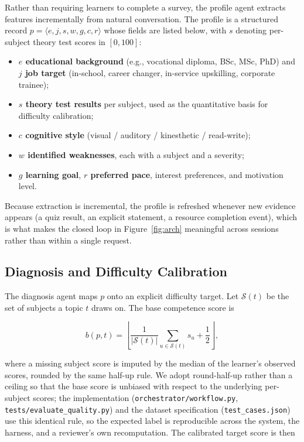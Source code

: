 Rather than requiring learners to complete a survey, the profile agent
extracts features incrementally from natural conversation. The profile is a
structured record $p = \langle e, j, s, w, g, c, r \rangle$ whose fields are
listed below, with $s$ denoting per-subject theory test scores in $[0,100]$:

\begin{itemize}
\item \textbf{$e$ educational background} (e.g., vocational diploma, BSc, MSc,
PhD) and \textbf{$j$ job target} (in-school, career changer, in-service
upskilling, corporate trainee);
\item \textbf{$s$ theory test results} per subject, used as the quantitative
basis for difficulty calibration;
\item \textbf{$c$ cognitive style} (visual / auditory / kinesthetic /
read-write);
\item \textbf{$w$ identified weaknesses}, each with a subject and a severity;
\item \textbf{$g$ learning goal}, \textbf{$r$ preferred pace}, interest
preferences, and motivation level.
\end{itemize}

Because extraction is incremental, the profile is refreshed whenever new
evidence appears (a quiz result, an explicit statement, a resource
completion event), which is what makes the closed loop in
Figure~\ref{fig:arch} meaningful across sessions rather than within a single
request.

\subsection{Diagnosis and Difficulty Calibration}
\label{ssec:diagnosis}

The diagnosis agent maps $p$ onto an explicit difficulty target. Let
$\mathcal{S}(t)$ be the set of subjects a topic $t$ draws on. The base
competence score is

\begin{equation}
b(p,t) = \left\lfloor \frac{1}{|\mathcal{S}(t)|}
\sum_{u \in \mathcal{S}(t)} s_u + \frac{1}{2} \right\rfloor,
\end{equation}

where a missing subject score is imputed by the median of the learner's
observed scores, rounded by the same half-up rule. We adopt round-half-up
rather than a ceiling so that the base score is unbiased with respect to the
underlying per-subject scores; the implementation
(\texttt{orchestrator/workflow.py}, \texttt{tests/evaluate\_quality.py}) and the
dataset specification (\texttt{test\_cases.json}) use this identical rule, so
the expected label is reproducible across the system, the harness, and a
reviewer's own recomputation. The calibrated target score is then

